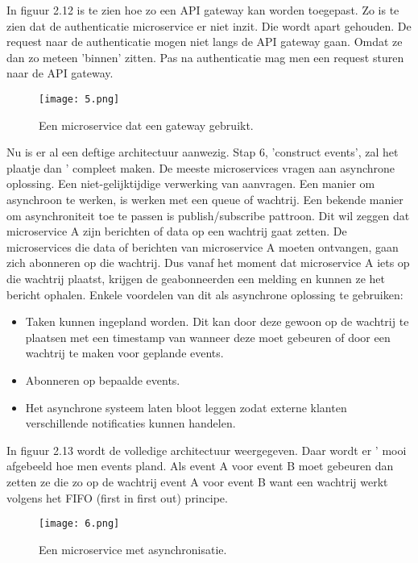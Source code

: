 In figuur 2.12 is te zien hoe zo een API gateway kan worden toegepast. Zo is te zien dat de authenticatie microservice er niet inzit. Die wordt apart gehouden. De request naar de authenticatie mogen niet langs de API gateway gaan. Omdat ze dan zo meteen 'binnen' zitten. Pas na authenticatie mag men een request sturen naar de API gateway.
\begin{figure}[h]
	\texttt{[image: 5.png]}
	\caption{Een microservice dat een gateway gebruikt. \textcite{Benetis2016}}
	\centering
\end{figure}

Nu is er al een deftige architectuur aanwezig. Stap 6, 'construct events', zal het plaatje dan ' compleet maken. De meeste microservices vragen aan asynchrone oplossing. Een niet-gelijktijdige verwerking van aanvragen. Een manier om asynchroon te  werken, is  werken met een queue of wachtrij. Een bekende manier om asynchroniteit toe te passen is publish/subscribe pattroon. Dit wil zeggen dat microservice A zijn berichten of data op een wachtrij gaat zetten. De microservices die data of berichten van microservice A moeten ontvangen, gaan zich abonneren op die wachtrij. Dus vanaf het moment dat microservice A iets op die wachtrij plaatst, krijgen de geabonneerden een melding en kunnen ze het bericht ophalen. Enkele voordelen van dit als asynchrone oplossing te gebruiken:
\begin{itemize}
	\item Taken kunnen ingepland worden. Dit kan door deze gewoon op de wachtrij te plaatsen met een timestamp van wanneer deze moet gebeuren of door een wachtrij te maken voor geplande events.
	\item Abonneren op bepaalde events.
	\item Het asynchrone systeem laten bloot leggen zodat externe klanten verschillende notificaties kunnen handelen.
\end{itemize}
In figuur 2.13 wordt de volledige architectuur  weergegeven. Daar wordt er ' mooi afgebeeld hoe men events pland. Als event A voor event B moet gebeuren dan zetten ze die zo op de wachtrij event A voor event B want een wachtrij  werkt volgens het FIFO (first in first out) principe.
\begin{figure}[h]
	\texttt{[image: 6.png]}
	\caption{Een microservice met asynchronisatie. \textcite{Benetis2016}}
	\centering
\end{figure}

